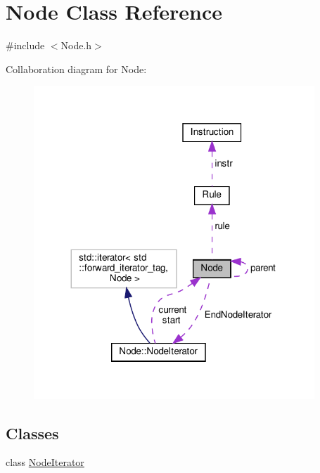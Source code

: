 \hypertarget{class_node}{}\section{Node Class Reference}
\label{class_node}


{\ttfamily \#include $<$Node.\+h$>$}



Collaboration diagram for Node\+:
\nopagebreak
\begin{figure}[H]
\begin{center}
\leavevmode
\includegraphics[width=299pt]{class_node__coll__graph}
\end{center}
\end{figure}
\subsection*{Classes}
\begin{DoxyCompactItemize}
\item 
class \hyperlink{class_node_1_1_node_iterator}{Node\+Iterator}
\end{DoxyCompactItemize}
